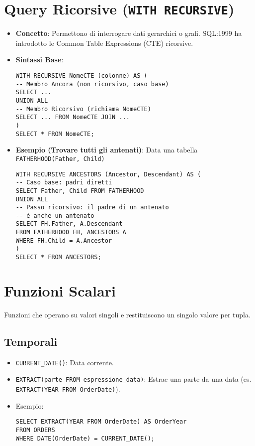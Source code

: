\section{Query Ricorsive (\texttt{WITH RECURSIVE})}
\begin{itemize}
	\item \textbf{Concetto}: Permettono di interrogare dati gerarchici o grafi. SQL:1999 ha introdotto le Common Table Expressions (CTE) ricorsive.
	\item \textbf{Sintassi Base}:
	\begin{verbatim}
WITH RECURSIVE NomeCTE (colonne) AS (
-- Membro Ancora (non ricorsivo, caso base)
SELECT ...
UNION ALL
-- Membro Ricorsivo (richiama NomeCTE)
SELECT ... FROM NomeCTE JOIN ...
)
SELECT * FROM NomeCTE;
	\end{verbatim}
	\item \textbf{Esempio (Trovare tutti gli antenati)}: Data una tabella \texttt{FATHERHOOD(Father, Child)}
	\begin{verbatim}
WITH RECURSIVE ANCESTORS (Ancestor, Descendant) AS (
-- Caso base: padri diretti
SELECT Father, Child FROM FATHERHOOD
UNION ALL
-- Passo ricorsivo: il padre di un antenato
-- è anche un antenato
SELECT FH.Father, A.Descendant
FROM FATHERHOOD FH, ANCESTORS A
WHERE FH.Child = A.Ancestor
)
SELECT * FROM ANCESTORS;
	\end{verbatim}
\end{itemize}

\section{Funzioni Scalari}
Funzioni che operano su valori singoli e restituiscono un singolo valore per tupla.

\subsection{Temporali}
\begin{itemize}
	\item \texttt{CURRENT\_DATE()}: Data corrente.
	\item \texttt{EXTRACT(parte FROM espressione\_data)}: Estrae una parte da una data (es. \texttt{EXTRACT(YEAR FROM OrderDate)}).
	\item Esempio:
	\begin{verbatim}
SELECT EXTRACT(YEAR FROM OrderDate) AS OrderYear
FROM ORDERS
WHERE DATE(OrderDate) = CURRENT_DATE();
	\end{verbatim}
\end{itemize}

